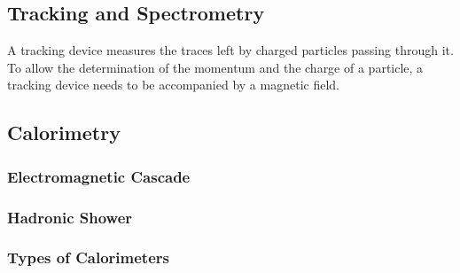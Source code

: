 \subsection{Tracking and Spectrometry}
A tracking device measures the traces left by charged particles passing through it. To allow the determination of the momentum and the charge of a particle, a tracking device needs to be accompanied by a magnetic field. 

\subsection{Calorimetry}

\subsubsection{Electromagnetic Cascade}

\subsubsection{Hadronic Shower}

\subsubsection{Types of Calorimeters}